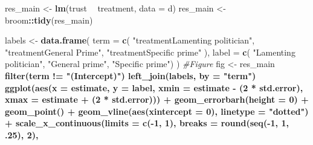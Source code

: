 \documentclass[]{book}
\newenvironment{Shaded}{\begin{snugshade}}{\end{snugshade}}
\newcommand{\KeywordTok}[1]{\textcolor[rgb]{0.13,0.29,0.53}{\textbf{#1}}}
\newcommand{\DataTypeTok}[1]{\textcolor[rgb]{0.13,0.29,0.53}{#1}}
\newcommand{\DecValTok}[1]{\textcolor[rgb]{0.00,0.00,0.81}{#1}}
\newcommand{\StringTok}[1]{\textcolor[rgb]{0.31,0.60,0.02}{#1}}
\newcommand{\CommentTok}[1]{\textcolor[rgb]{0.56,0.35,0.01}{\textit{#1}}}
\newcommand{\OperatorTok}[1]{\textcolor[rgb]{0.81,0.36,0.00}{\textbf{#1}}}
\newcommand{\NormalTok}[1]{#1}
\begin{document}
\begin{Shaded}
\begin{Highlighting}[]
\NormalTok{res_main <-}\StringTok{  }\KeywordTok{lm}\NormalTok{(trust }\OperatorTok{~}\StringTok{ }\NormalTok{treatment, }\DataTypeTok{data =}\NormalTok{ d) }
\NormalTok{res_main <-}\StringTok{ }\NormalTok{broom}\OperatorTok{::}\KeywordTok{tidy}\NormalTok{(res_main)}

\NormalTok{labels <-}\StringTok{ }\KeywordTok{data.frame}\NormalTok{(}
  \DataTypeTok{term =} \KeywordTok{c}\NormalTok{(}
    \StringTok{"treatmentLamenting politician"}\NormalTok{,}
    \StringTok{"treatmentGeneral Prime"}\NormalTok{,}
    \StringTok{"treatmentSpecific prime"}
\NormalTok{  ),}
  \DataTypeTok{label =} \KeywordTok{c}\NormalTok{( }\StringTok{"Lamenting politician"}\NormalTok{,}
             \StringTok{"General prime"}\NormalTok{,}
             \StringTok{"Specific prime"}\NormalTok{)}
\NormalTok{)}
\CommentTok{#Figure}
\NormalTok{fig <-}\StringTok{   }\NormalTok{res_main }\OperatorTok{%>%}
\StringTok{  }\KeywordTok{filter}\NormalTok{(term }\OperatorTok{!=}\StringTok{ "(Intercept)"}\NormalTok{) }\OperatorTok{%>%}\StringTok{ }
\StringTok{  }\KeywordTok{left_join}\NormalTok{(labels, }\DataTypeTok{by =} \StringTok{"term"}\NormalTok{) }\OperatorTok{%>%}\StringTok{ }
\StringTok{  }
\StringTok{  }\KeywordTok{ggplot}\NormalTok{(}\KeywordTok{aes}\NormalTok{(}\DataTypeTok{x =}\NormalTok{ estimate, }\DataTypeTok{y =}\NormalTok{ label,}
             \DataTypeTok{xmin =}\NormalTok{ estimate }\OperatorTok{-}\StringTok{ }\NormalTok{(}\DecValTok{2} \OperatorTok{*}\StringTok{ }\NormalTok{std.error),}
             \DataTypeTok{xmax =}\NormalTok{ estimate }\OperatorTok{+}\StringTok{ }\NormalTok{(}\DecValTok{2} \OperatorTok{*}\StringTok{ }\NormalTok{std.error))) }\OperatorTok{+}
\StringTok{   }\KeywordTok{geom_errorbarh}\NormalTok{(}\DataTypeTok{height =} \DecValTok{0}\NormalTok{) }\OperatorTok{+}
\StringTok{  }\KeywordTok{geom_point}\NormalTok{() }\OperatorTok{+}
\StringTok{  }\KeywordTok{geom_vline}\NormalTok{(}\KeywordTok{aes}\NormalTok{(}\DataTypeTok{xintercept =} \DecValTok{0}\NormalTok{), }\DataTypeTok{linetype =} \StringTok{"dotted"}\NormalTok{) }\OperatorTok{+}
\StringTok{  }\KeywordTok{scale_x_continuous}\NormalTok{(}\DataTypeTok{limits =} \KeywordTok{c}\NormalTok{(}\OperatorTok{-}\DecValTok{1}\NormalTok{, }\DecValTok{1}\NormalTok{),}
                     \DataTypeTok{breaks =} \KeywordTok{round}\NormalTok{(}\KeywordTok{seq}\NormalTok{(}\OperatorTok{-}\DecValTok{1}\NormalTok{, }\DecValTok{1}\NormalTok{, .}\DecValTok{25}\NormalTok{), }\DecValTok{2}\NormalTok{),}
}}}
\end{Highlighting}
\end{Shaded}
\end{document}
